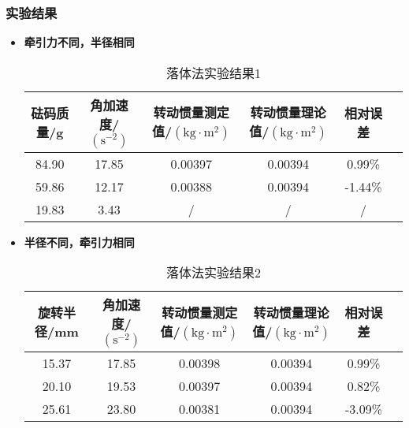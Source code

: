 \documentclass[12pt,hyperref,a4paper,UTF8]{ctexart}
\begin{document}
\subsubsection{实验结果}
    \begin{itemize}
        \item \textbf{牵引力不同，半径相同}
            \begin{table}[h!]
                \centering
                \begin{tabular}{cccccc}
                \toprule
                \textbf{砝码质量/g} & \textbf{角加速度/$(\text{s}^{-2})$} & \textbf{转动惯量测定值/$(\text{kg}\cdot \text{m}^2)$} & \textbf{转动惯量理论值/$(\text{kg}\cdot \text{m}^2)$} & \textbf{相对误差} \\
                \midrule
                84.90 & 17.85 & 0.00397 & 0.00394 & 0.99\% \\
                59.86 & 12.17 & 0.00388 & 0.00394 & -1.44\% \\
                19.83 & 3.43 & /          & /          & / \\
                \bottomrule
                \end{tabular}
                \caption{落体法实验结果1}
                \end{table}
                
        \item \textbf{半径不同，牵引力相同}
            \begin{table}[h!]
                \centering
                \begin{tabular}{cccccc}
                \toprule
                \textbf{旋转半径/mm} & \textbf{角加速度/$(\text{s}^{-2})$} & \textbf{转动惯量测定值/$(\text{kg}\cdot \text{m}^2)$} & \textbf{转动惯量理论值/$(\text{kg}\cdot \text{m}^2)$} & \textbf{相对误差} \\
                \midrule
                15.37 & 17.85 & 0.00398 & 0.00394 & 0.99\% \\
                20.10 & 19.53 & 0.00397 & 0.00394 & 0.82\% \\
                25.61 & 23.80 & 0.00381 & 0.00394 & -3.09\% \\
                \bottomrule
                \end{tabular}
                \caption{落体法实验结果2}
                \end{table}
                
    \end{itemize}
\end{document}
